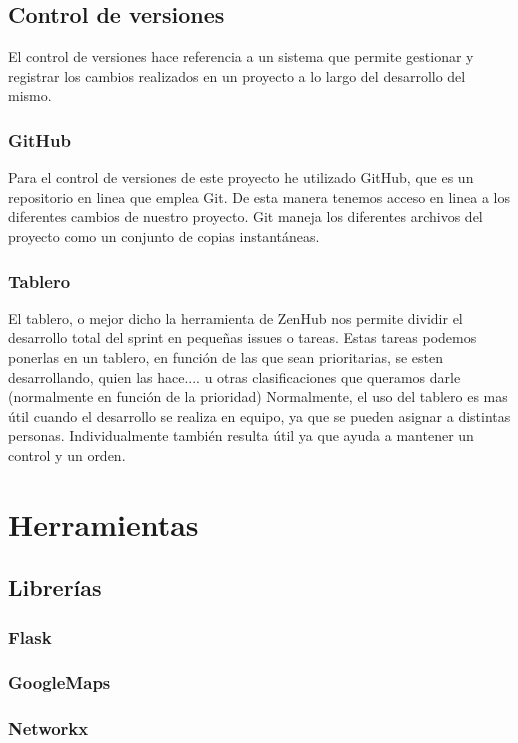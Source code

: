 \subsection{Control de versiones}
El control de versiones hace referencia a un sistema que permite gestionar y registrar los cambios realizados en un proyecto a lo largo del desarrollo del mismo.

\subsubsection{GitHub}
Para el control de versiones de este proyecto he utilizado GitHub, que es un repositorio en linea que emplea Git. De esta manera tenemos acceso en linea a los diferentes cambios de nuestro proyecto.
Git maneja los diferentes archivos del proyecto como un conjunto de copias instantáneas. 

\subsubsection{Tablero}
El tablero, o mejor dicho la herramienta de ZenHub nos permite dividir el desarrollo total del sprint en pequeñas issues o tareas. Estas tareas podemos ponerlas en un tablero, en función de las que sean prioritarias, se esten desarrollando, quien las hace.... u otras clasificaciones que queramos darle (normalmente en función de la prioridad)
Normalmente, el uso del tablero es mas útil cuando el desarrollo se realiza en equipo, ya que se pueden asignar a distintas personas. Individualmente también resulta útil ya que ayuda a mantener un control y un orden.

\section{Herramientas}

\subsection{Librerías}

\subsubsection{Flask}
\subsubsection{GoogleMaps}
\subsubsection{Networkx}



